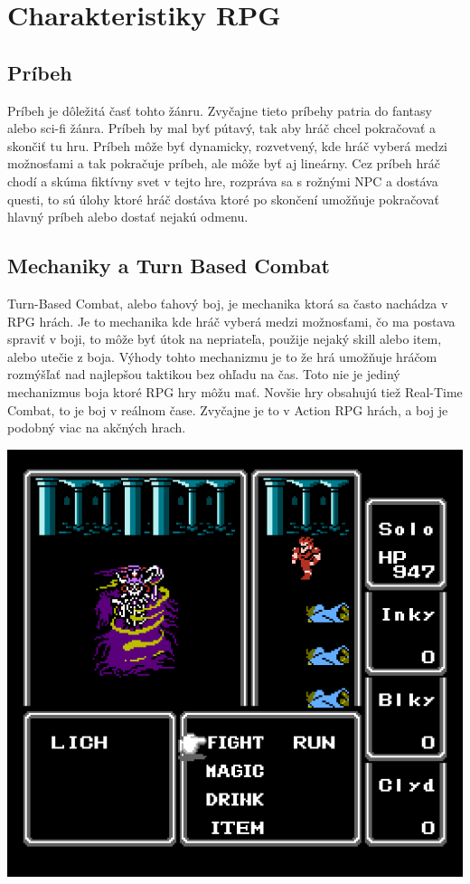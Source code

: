 \documentclass [10pt, twoside, slovak, a4paper] {article}
\begin{document}
\section{Charakteristiky RPG}
\subsection {Príbeh}
Príbeh je dôležitá časť tohto žánru. Zvyčajne tieto príbehy patria do fantasy alebo sci-fi žánra. Príbeh by mal byť pútavý, tak aby hráč chcel pokračovať a skončiť tu hru. Príbeh môže byť dynamicky, rozvetvený, kde hráč vyberá medzi možnosťami a tak pokračuje príbeh, ale môže byť aj lineárny. Cez príbeh hráč chodí a skúma fiktívny svet v tejto hre, rozpráva sa s rožnými NPC a dostáva questi, to sú úlohy ktoré hráč dostáva ktoré po skončení umožňuje pokračovať hlavný príbeh alebo dostať nejakú odmenu.
\subsection{Mechaniky a Turn Based Combat}
Turn-Based Combat, alebo ťahový boj, je mechanika ktorá sa často nachádza v RPG hrách. Je to mechanika kde hráč vyberá medzi možnosťami, čo ma postava spraviť v boji, to môže byť útok na nepriateľa, použije nejaký skill alebo item, alebo utečie z boja. Výhody tohto mechanizmu je to že hrá umožňuje hráčom rozmýšľať nad najlepšou taktikou bez ohľadu na čas. Toto nie je jediný mechanizmus boja ktoré RPG hry môžu mať. Novšie hry obsahujú tiež Real-Time Combat, to je boj v reálnom čase. Zvyčajne je to v Action RPG hrách, a boj je podobný viac na akčných hrach.



\includegraphics[scale=0.3]{FFTBC.png}
\end{document}
